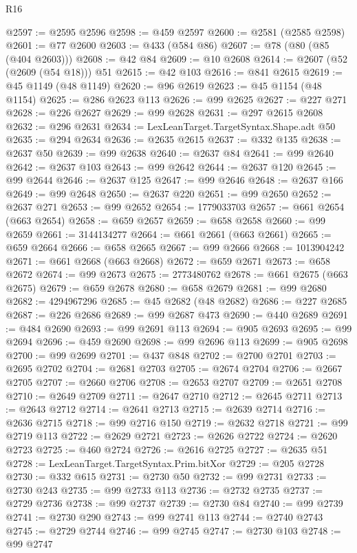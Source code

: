 \begin{lexlean}{R16}
\begin{coremodule}
@2597 := @2595 @2596
@2598 := @459 @2597
@2600 := @2581 (@2585 @2598)
@2601 := @77 @2600
@2603 := @433 (@584 @86)
@2607 := @78 (@80 (@85 (@404 @2603)))
@2608 := @42 @84
@2609 := @10 @2608
@2614 := @2607 (@52 (@2609 (@54 @18))) @51
@2615 := @42 @103
@2616 := @841 @2615
@2619 := @45 @1149 (@48 @1149)
@2620 := @96 @2619
@2623 := @45 @1154 (@48 @1154)
@2625 := @286 @2623 @113
@2626 := @99 @2625
@2627 := @227 @271
@2628 := @226 @2627
@2629 := @99 @2628
@2631 := @297 @2615 @2608
@2632 := @296 @2631
@2634 := LexLeanTarget.TargetSyntax.Shape.adt @50
@2635 := @294 @2634
@2636 := @2635 @2615
@2637 := @332 @135
@2638 := @2637 @50
@2639 := @99 @2638
@2640 := @2637 @84
@2641 := @99 @2640
@2642 := @2637 @103
@2643 := @99 @2642
@2644 := @2637 @120
@2645 := @99 @2644
@2646 := @2637 @125
@2647 := @99 @2646
@2648 := @2637 @166
@2649 := @99 @2648
@2650 := @2637 @220
@2651 := @99 @2650
@2652 := @2637 @271
@2653 := @99 @2652
@2654 := 1779033703
@2657 := @661 @2654 (@663 @2654)
@2658 := @659 @2657
@2659 := @658 @2658
@2660 := @99 @2659
@2661 := 3144134277
@2664 := @661 @2661 (@663 @2661)
@2665 := @659 @2664
@2666 := @658 @2665
@2667 := @99 @2666
@2668 := 1013904242
@2671 := @661 @2668 (@663 @2668)
@2672 := @659 @2671
@2673 := @658 @2672
@2674 := @99 @2673
@2675 := 2773480762
@2678 := @661 @2675 (@663 @2675)
@2679 := @659 @2678
@2680 := @658 @2679
@2681 := @99 @2680
@2682 := 4294967296
@2685 := @45 @2682 (@48 @2682)
@2686 := @227 @2685
@2687 := @226 @2686
@2689 := @99 @2687 @473
@2690 := @440 @2689
@2691 := @484 @2690
@2693 := @99 @2691 @113
@2694 := @905 @2693
@2695 := @99 @2694
@2696 := @459 @2690
@2698 := @99 @2696 @113
@2699 := @905 @2698
@2700 := @99 @2699
@2701 := @437 @848
@2702 := @2700 @2701
@2703 := @2695 @2702
@2704 := @2681 @2703
@2705 := @2674 @2704
@2706 := @2667 @2705
@2707 := @2660 @2706
@2708 := @2653 @2707
@2709 := @2651 @2708
@2710 := @2649 @2709
@2711 := @2647 @2710
@2712 := @2645 @2711
@2713 := @2643 @2712
@2714 := @2641 @2713
@2715 := @2639 @2714
@2716 := @2636 @2715
@2718 := @99 @2716 @150
@2719 := @2632 @2718
@2721 := @99 @2719 @113
@2722 := @2629 @2721
@2723 := @2626 @2722
@2724 := @2620 @2723
@2725 := @460 @2724
@2726 := @2616 @2725
@2727 := @2635 @51
@2728 := LexLeanTarget.TargetSyntax.Prim.bitXor
@2729 := @205 @2728
@2730 := @332 @615
@2731 := @2730 @50
@2732 := @99 @2731
@2733 := @2730 @243
@2735 := @99 @2733 @113
@2736 := @2732 @2735
@2737 := @2729 @2736
@2738 := @99 @2737
@2739 := @2730 @84
@2740 := @99 @2739
@2741 := @2730 @290
@2743 := @99 @2741 @113
@2744 := @2740 @2743
@2745 := @2729 @2744
@2746 := @99 @2745
@2747 := @2730 @103
@2748 := @99 @2747

\end{coremodule}
\end{lexlean}
